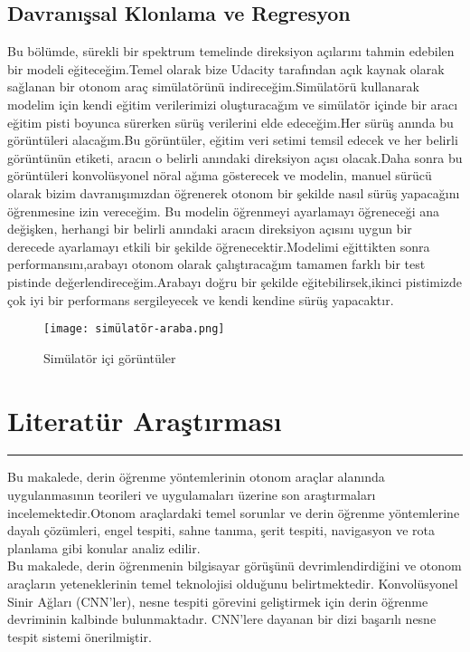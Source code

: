 \documentclass{article}
\begin{document}
\subsection{Davranışsal Klonlama ve Regresyon}Bu bölümde, sürekli bir spektrum temelinde direksiyon açılarını tahmin edebilen bir modeli eğiteceğim.Temel olarak bize Udacity tarafından açık kaynak olarak sağlanan bir otonom araç simülatörünü indireceğim.Simülatörü kullanarak modelim için kendi eğitim verilerimizi oluşturacağım ve simülatör içinde bir aracı eğitim pisti boyunca sürerken sürüş verilerini elde edeceğim.Her sürüş anında bu görüntüleri alacağım.Bu görüntüler, eğitim veri setimi temsil edecek ve her belirli görüntünün etiketi, aracın o belirli anındaki direksiyon açısı olacak.Daha sonra bu görüntüleri konvolüsyonel nöral ağıma gösterecek ve modelin, manuel sürücü olarak bizim davranışımızdan öğrenerek otonom bir şekilde nasıl sürüş yapacağını öğrenmesine izin vereceğim. Bu modelin öğrenmeyi ayarlamayı öğreneceği ana değişken, herhangi bir belirli anındaki aracın direksiyon açısını uygun bir derecede ayarlamayı etkili bir şekilde öğrenecektir.Modelimi eğittikten sonra performansını,arabayı otonom olarak çalıştıracağım tamamen farklı bir test pistinde değerlendireceğim.Arabayı doğru bir şekilde eğitebilirsek,ikinci pistimizde çok iyi bir performans sergileyecek ve kendi kendine sürüş yapacaktır.
\\[30pt]
\begin{figure}[h]
  \centering
  \texttt{[image: simülatör-araba.png]} %
  \caption{Simülatör içi görüntüler}
  \label{fig:resim_etiketi}
\end{figure}

\newpage

\section{Literatür Araştırması}
\rule{\textwidth}{0.5pt}
Bu makalede\cite{ni2020survey}, derin öğrenme yöntemlerinin otonom araçlar alanında uygulanmasının teorileri ve uygulamaları üzerine son araştırmaları incelemektedir.Otonom araçlardaki temel sorunlar ve derin öğrenme yöntemlerine dayalı çözümleri, engel tespiti, sahne tanıma, şerit tespiti, navigasyon ve rota planlama gibi konular analiz edilir.\\[15pt]

\noindent Bu makalede\cite{simhambhatla2019self}, derin öğrenmenin bilgisayar görüşünü devrimlendirdiğini ve otonom araçların yeteneklerinin temel teknolojisi olduğunu belirtmektedir. Konvolüsyonel Sinir Ağları (CNN'ler), nesne tespiti görevini geliştirmek için derin öğrenme devriminin kalbinde bulunmaktadır. CNN'lere dayanan bir dizi başarılı nesne tespit sistemi önerilmiştir.\\[15pt]
\end{document}
